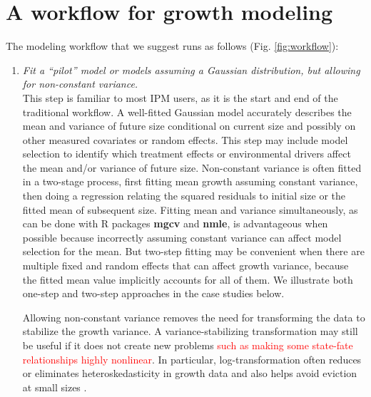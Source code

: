 \documentclass[12pt]{article}
\newcommand{\new}{\textcolor{red}}
\begin{document}
\section{A workflow for growth modeling}
The modeling workflow that we suggest runs as follows (Fig. \ref{fig:workflow}):
\begin{enumerate}[label=\arabic*., listparindent=1.5em]
\item \textit{Fit a ``pilot'' model or models assuming a Gaussian distribution, but allowing for non-constant variance.}
\\ 
This step is familiar to most IPM users, as it is the start and end of the traditional workflow. 
A well-fitted Gaussian model accurately describes the mean and variance of future size conditional on current size and possibly on other measured covariates or random effects. 
This step may include model selection to identify which treatment effects or environmental drivers affect the mean and/or variance of future size. 
Non-constant variance is often fitted in a two-stage process, first fitting mean growth assuming constant variance, then doing a regression relating the squared residuals to initial size or the fitted mean of subsequent size. 
Fitting mean and variance simultaneously, as can be done with R packages \textbf{mgcv} and \textbf{nmle}, is advantageous when possible because incorrectly assuming constant variance can affect model selection for the mean. 
But two-step fitting may be convenient when there are multiple fixed and random effects that can affect growth variance, because the fitted mean value implicitly accounts for all of them. 
We illustrate both one-step and two-step approaches in the case studies below. 

Allowing non-constant variance removes the need for transforming the data to stabilize the growth variance. 
A variance-stabilizing transformation may still be useful if it does not create new problems \new{such as making some state-fate
relationships highly nonlinear}. %
In particular, log-transformation often reduces or eliminates heteroskedasticity in growth data \citep{ellner-etal-2016} 
and also helps avoid eviction at small sizes \citep{williams2012avoiding}. 


\end{enumerate}
\end{document}

